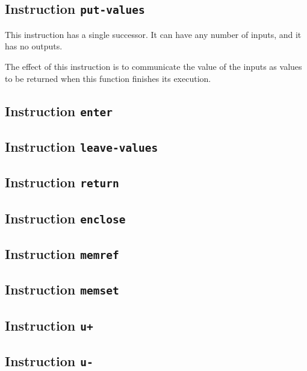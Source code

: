 \subsection{Instruction \texttt{put-values}}
\label{mir-instruction-put-values}

This instruction has a single successor.  It can have any number of
inputs, and it has no outputs. 

The effect of this instruction is to communicate the value of the
inputs as values to be returned when this function finishes its
execution.

\subsection{Instruction \texttt{enter}}
\label{mir-instruction-enter}

\subsection{Instruction \texttt{leave-values}}
\label{mir-instruction-leave-values}

\subsection{Instruction \texttt{return}}
\label{mir-instruction-return}

\subsection{Instruction \texttt{enclose}}
\label{mir-instruction-enclose}

\subsection{Instruction \texttt{memref}}
\label{mir-instruction-memref}

\subsection{Instruction \texttt{memset}}
\label{mir-instruction-memset}

\subsection{Instruction \texttt{u+}}
\label{mir-instruction-u+}

\subsection{Instruction \texttt{u-}}
\label{mir-instruction-u-}


